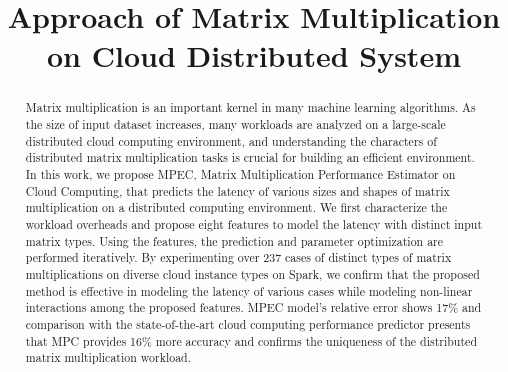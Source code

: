 \documentclass[10pt, conference, compsocconf]{IEEEtran}
\begin{document}

\title{Approach of Matrix Multiplication on Cloud Distributed System}


\author{
\and
{}
}

\maketitle

\begin{abstract}
  Matrix multiplication is an important kernel in many machine learning algorithms. As the size of input dataset increases, many workloads are analyzed on a large-scale distributed cloud computing environment, and understanding the characters of distributed matrix multiplication tasks is crucial for building an efficient environment. In this work, we propose MPEC, Matrix Multiplication Performance Estimator on Cloud Computing, that predicts the latency of various sizes and shapes of matrix multiplication on a distributed computing environment. We first characterize the workload overheads and propose eight features to model the latency with distinct input matrix types. Using the features, the prediction and parameter optimization are performed iteratively. By experimenting over 237 cases of distinct types of matrix multiplications on diverse cloud instance types on Spark, we confirm that the proposed method is effective in modeling the latency of various cases while modeling non-linear interactions among the proposed features. MPEC model's relative error shows 17\% and comparison with the state-of-the-art cloud computing performance predictor presents that MPC provides 16\% more accuracy and confirms the uniqueness of the distributed matrix multiplication workload. 
\end{abstract}

\IEEEpeerreviewmaketitle
\end{document}
